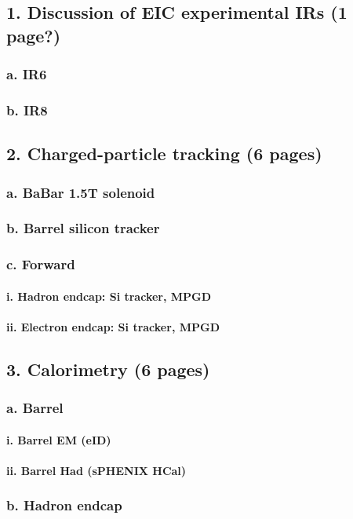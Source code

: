 \documentclass{report}
\begin{document}
\subsection{1. Discussion of EIC experimental IRs (1 page?)}
\subsubsection{a. IR6}
\subsubsection{b. IR8}
\subsection{2. Charged-particle tracking (6 pages)}
\subsubsection{a. BaBar 1.5T solenoid}
\subsubsection{b. Barrel silicon tracker}
\subsubsection{c. Forward}
\paragraph{i. Hadron endcap: Si tracker, MPGD}
\paragraph{ii. Electron endcap: Si tracker, MPGD}
\subsection{3. Calorimetry (6 pages)}
\subsubsection{a. Barrel}
\paragraph{i. Barrel EM (eID)}
\paragraph{ii. Barrel Had (sPHENIX HCal)}
\subsubsection{b. Hadron endcap}
\end{document}

